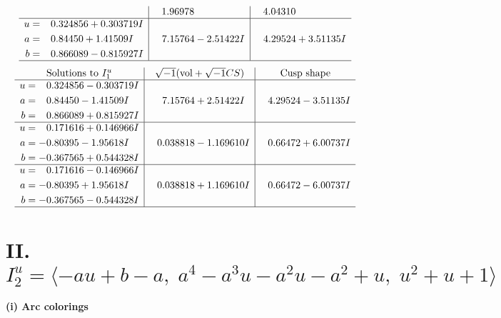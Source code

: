 \documentclass[1p]{elsarticle_modified}
\theoremstyle{definition}
\newcommand{\I}{\sqrt{-1}}
\begin{document}
$$\begin{array}{c|c|c}
 & \phantom{-}1.96978\phantom{ +0.000000I} & \phantom{-}4.04310\phantom{ +0.000000I} \\ \hline\begin{aligned}
u &= \phantom{-}0.324856 + 0.303719 I \\
a &= \phantom{-}0.84450 + 1.41509 I \\
b &= \phantom{-}0.866089 - 0.815927 I\end{aligned}
 & \phantom{-}7.15764 - 2.51422 I & \phantom{-}4.29524 + 3.51135 I\\
 \hline 
 \end{array}$$\newpage$$\begin{array}{c|c|c}  
\text{Solutions to }I^u_{1}& \I (\text{vol} + \sqrt{-1}CS) & \text{Cusp shape}\\
 \hline 
\begin{aligned}
u &= \phantom{-}0.324856 - 0.303719 I \\
a &= \phantom{-}0.84450 - 1.41509 I \\
b &= \phantom{-}0.866089 + 0.815927 I\end{aligned}
 & \phantom{-}7.15764 + 2.51422 I & \phantom{-}4.29524 - 3.51135 I \\ \hline\begin{aligned}
u &= \phantom{-}0.171616 + 0.146966 I \\
a &= -0.80395 - 1.95618 I \\
b &= -0.367565 + 0.544328 I\end{aligned}
 & \phantom{-}0.038818 - 1.169610 I & \phantom{-}0.66472 + 6.00737 I \\ \hline\begin{aligned}
u &= \phantom{-}0.171616 - 0.146966 I \\
a &= -0.80395 + 1.95618 I \\
b &= -0.367565 - 0.544328 I\end{aligned}
 & \phantom{-}0.038818 + 1.169610 I & \phantom{-}0.66472 - 6.00737 I\\
 \hline 
 \end{array}$$\newpage\newpage\renewcommand{\arraystretch}{1}
\centering \section*{II. $I^u_{2}= \langle - a u+b- a,\;a^4- a^3 u- a^2 u- a^2+u,\;u^2+u+1 \rangle$}
\flushleft \textbf{(i) Arc colorings}\\
\end{document}
